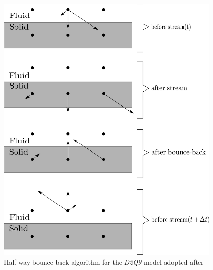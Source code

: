\begin{figure}[htbp]
\centering
\includegraphics[scale=0.6]{Chapter3/figures/lbm/bounce.pdf}
\caption[Half-way bounce back algorithm for the \textit{D2Q9} model ]{Half-way bounce back algorithm for the \textit{D2Q9} model adopted after \citet{sukop2006}}
\label{fig:bounce}
\end{figure}

